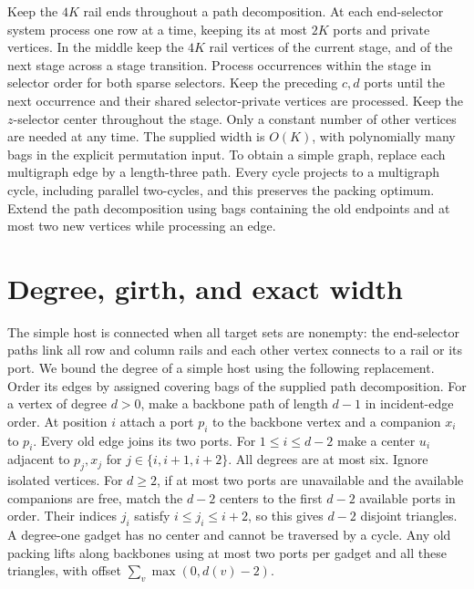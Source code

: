 \documentclass[11pt]{article}
\begin{document}
Keep the \(4K\) rail ends throughout a path decomposition.
At each end-selector system process one row at a time, keeping
its at most \(2K\) ports and private vertices. In the middle keep
the \(4K\) rail vertices of the current stage, and of the next
stage across a stage transition. Process occurrences within the
stage in selector order for both sparse selectors.
Keep the preceding \(c,d\) ports until the next occurrence
and their shared selector-private vertices are processed.
Keep the \(z\)-selector center throughout the stage.
Only a constant number of other vertices are needed at any
time. The supplied width is \(O(K)\), with polynomially many
bags in the explicit permutation input. To obtain a simple
graph, replace each multigraph edge by a length-three path.
Every cycle projects to a multigraph cycle, including parallel
two-cycles, and this preserves the packing optimum. Extend the
path decomposition using bags containing the old endpoints and
at most two new vertices while processing an edge.

\section{Degree, girth, and exact width}

The simple host is connected when all target sets are nonempty:
the end-selector paths link all row and column rails and each
other vertex connects to a rail or its port. We bound the degree
of a simple host using the following replacement. Order its
edges by assigned covering bags of the supplied path decomposition.
For a vertex of degree \(d>0\), make a backbone path of length
\(d-1\) in incident-edge order. At position \(i\) attach a
port \(p_i\) to the backbone vertex and a companion \(x_i\) to
\(p_i\). Every old edge joins its two ports. For \(1\le i\le d-2\)
make a center \(u_i\) adjacent to \(p_j,x_j\) for
\(j\in\{i,i+1,i+2\}\). All degrees are at most six. Ignore
isolated vertices. For \(d\ge2\), if at most two ports are unavailable and
the available companions are free, match the \(d-2\) centers
to the first \(d-2\) available ports in order. Their indices
\(j_i\) satisfy \(i\le j_i\le i+2\), so this gives \(d-2\)
disjoint triangles. A degree-one gadget has no center and cannot
be traversed by a cycle. Any old packing lifts along backbones using
at most two ports per gadget and all these triangles, with
offset \(\sum_v\max(0,d(v)-2)\).
\end{document}
